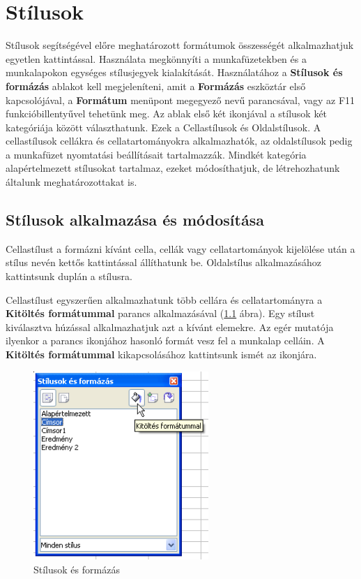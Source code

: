 \chapter{Stílusok}
\thispagestyle{empty}

Stílusok segítségével előre meghatározott formátumok
összességét alkalmazhatjuk egyetlen kattintással. Használata
megkönnyíti a munkafüzetekben és a munkalapokon egységes
stílusjegyek kialakítását. Használatához a
\textbf{Stílusok és formázás} ablakot kell megjeleníteni,
amit a \textbf{Formázás} eszköztár első kapcsolójával, a
\textbf{Formátum} menüpont megegyező nevű parancsával,
vagy az F11 funkcióbillentyűvel tehetünk meg. Az ablak első
két ikonjával a stílusok két kategóriája között
választhatunk. Ezek a Cellastílusok és Oldalstílusok. A
cellastílusok cellákra és cellatartományokra alkalmazhatók, az
oldalstílusok pedig a munkafüzet nyomtatási beállításait
tartalmazzák. Mindkét kategória alapértelmezett stílusokat
tartalmaz, ezeket módosíthatjuk, de létrehozhatunk általunk
meghatározottakat is.


\section{Stílusok alkalmazása és módosítása}

Cellastílust a formázni kívánt cella, cellák vagy
cellatartományok kijelölése után a stílus nevén kettős
kattintással állíthatunk be. Oldalstílus alkalmazásához
kattintsunk duplán a stílusra.

Cellastílust egyszerűen alkalmazhatunk több cellára és
cellatartományra a \textbf{Kitöltés formátummal}  parancs
alkalmazásával (\ref{StílusokFormázás} ábra). Egy stílust kiválasztva
húzással alkalmazhatjuk azt a kívánt elemekre. Az egér
mutatója ilyenkor a parancs ikonjához hasonló formát vesz fel a
munkalap celláin. A \textbf{Kitöltés formátummal}
kikapcsolásához kattintsunk ismét az ikonjára.

\begin{figure}[!h]
\begin{center}
\includegraphics[width=6.644cm]{oocalcv2-img157.png}
\caption{Stílusok és formázás}\label{StílusokFormázás}
\end{center}
\end{figure}

